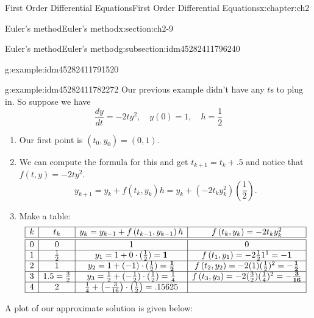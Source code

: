 \documentclass[oneside,10pt,]{book}
\numberwithin{equation}{section}
\numberwithin{equation}{section}
\newcommand{\amp}{&}
\begin{document}
\begin{chapterptx}{First Order Differential Equations}{}{First Order Differential Equations}{}{}{x:chapter:ch2}
\begin{sectionptx}{Euler's method}{}{Euler's method}{}{}{x:section:ch2-9}
\begin{subsectionptx}{Euler's method}{}{Euler's method}{}{}{g:subsection:idm45282411796240}
\begin{example}{}{g:example:idm45282411791520}
\end{example}
\begin{example}{}{g:example:idm45282411782272}%
Our previous example didn't have any \(t\)s to plug in. So suppose we have%
\begin{equation*}
\frac{dy}{dt}=-2ty^{2},\quad y(0)=1,\quad h=\frac{1}{2}
\end{equation*}
%
%
\begin{enumerate}
\item{}Our first point is \((t_{0},y_{0})=\left(0,1\right)\).%
\item{}We can compute the formula for this and get \(t_{k+1}=t_{k}+.5\) and notice that \(f\left(t,y\right)=-2ty^{2}\).%
\begin{equation*}
y_{k+1}=y_{k}+f\left(t_{k},y_{k}\right)h=y_{k}+\left(-2t_{k}y_{k}^{2}\right)(\frac{1}{2}).
\end{equation*}
%
\item{}Make a table:%
\begin{equation*}
\begin{array}{|c|c|c|c|}
\hline
k \amp t_{k} \amp y_{k}=y_{k-1}+f\left(t_{k-1},y_{k-1}\right)h \amp f\left(t_{k},y_{k}\right)=-2t_{k}y_{k}^{2}\\
\hline
\hline
0 \amp 0 \amp 1 \amp 0\\
\hline
1 \amp \frac{1}{2} \amp y_{1}=1+0\cdot(\frac{1}{2})=\mathbf{1} \amp f\left(t_{1},y_{1}\right)=-2\frac{1}{2}1^{1}=\mathbf{-1}\\
\hline
2 \amp 1 \amp y_{2}=1+(-1)\cdot(\frac{1}{2})=\mathbf{\frac{1}{2}} \amp f\left(t_{2},y_{2}\right)=-2(1)(\frac{1}{2})^{2}=\mathbf{-\frac{1}{2}}\\
\hline
3 \amp 1.5=\frac{3}{2} \amp y_{3}=\frac{1}{2}+(-\frac{1}{2})\cdot(\frac{1}{2})=\frac{1}{4} \amp f\left(t_{3},y_{3}\right)=-2(\frac{3}{2})(\frac{1}{4})^{2}=\mathbf{-\frac{3}{16}}\\
\hline
4 \amp 2 \amp \frac{1}{4}+\left(-\frac{3}{16}\right)\cdot\left(\frac{1}{2}\right)=.15625 \amp \\
\hline
\end{array}
\end{equation*}
%
\end{enumerate}
A plot of our approximate solution is given below:%
\begin{image}{0}{1}{0}%

\end{image}
\end{example}
\end{subsectionptx}
\end{sectionptx}
\end{chapterptx}
\end{document}
